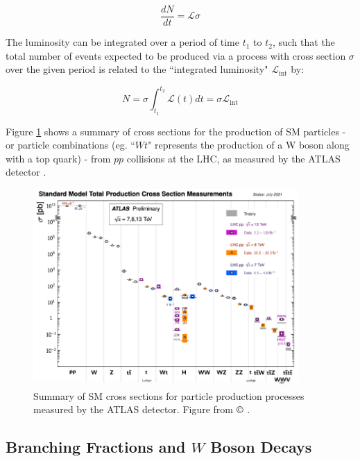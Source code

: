 \begin{equation}
\frac{dN}{dt} = \mathcal{L}\sigma
\end{equation}

The luminosity can be integrated over a period of time \(t_1\) to \(t_2\), such that the total number of events expected to be produced via a process with cross section \(\sigma\) over the given period is related to the ``integrated luminosity" \(\mathcal{L}_\text{int}\) by:

\begin{equation}
N = \sigma\int_{t_1}^{t_2}\mathcal{L}(t)dt = \sigma\mathcal{L}_\text{int}
\end{equation}

Figure \ref{fig:ATLAS_xsections} shows a summary of cross sections for the production of SM particles - or particle combinations (eg. ``\(Wt\)" represents the production of a W boson along with a top quark) - from \(pp\) collisions at the LHC, as measured by the ATLAS detector \cite{atlas}. 

\begin{figure}[H]
	\centering
	\includegraphics[width=0.9\textwidth]{Figures/3/ATLAS_xsections.pdf}
	\caption[]{Summary of SM cross sections for particle production processes measured by the ATLAS detector. Figure from \(\copyright\) \cite{ATL-PHYS-PUB-2021-032}.}
	\label{fig:ATLAS_xsections}
\end{figure}

\subsection{Branching Fractions and \(W\) Boson Decays}

